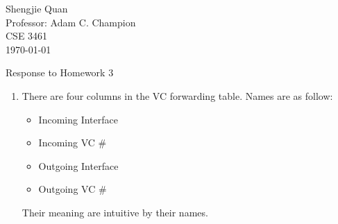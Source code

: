 \documentclass[12pt]{article}
\title{}
\author{}
\date{}                                           %
\begin{document}
\begin{flushleft}
Shengjie Quan\\
Professor: Adam C. Champion\\
CSE 3461	 \\
\today \\
\end{flushleft}

\begin{center}
Response to Homework 3
\end{center}

\setlength{\parindent}{0.5in}

\begin{singlespace}

\begin{enumerate}

\item 
	There are four columns in the VC forwarding table. Names are as follow:
	\begin{itemize}
	\item Incoming Interface
	\item Incoming VC \#
	\item Outgoing Interface
	\item Outgoing VC \#
	\end{itemize}
	Their meaning are intuitive by their names.


\end{enumerate}
\end{singlespace}
\end{document}
